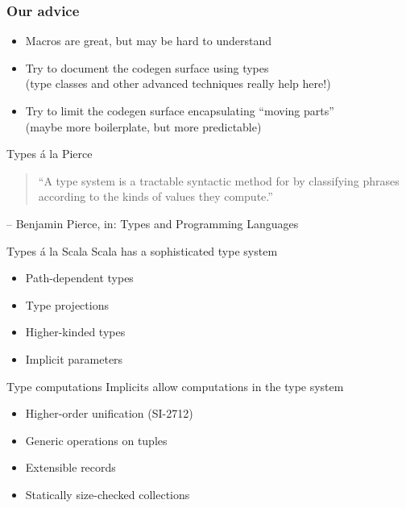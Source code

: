 \documentclass{beamer}
\begin{document}
\begin{frame}[fragile]
\frametitle{Our advice}
  \begin{itemize}
    \item Macros are great, but may be hard to understand
    \item Try to document the codegen surface using types\\
      (type classes and other advanced techniques really help here!)
    \item Try to limit the codegen surface encapsulating ``moving parts''\\
      (maybe more boilerplate, but more predictable)
  \end{itemize}
\end{frame}


\begin{frame}
\vskip40pt
\begin{center}
\end{center}
\end{frame}

\begin{frame}{Types \'a la Pierce}
  \begin{quote}
    ``A type system is a tractable syntactic method for  by classifying phrases according to the kinds of values they compute.''
  \end{quote}
  \hfill -- Benjamin Pierce, in: Types and Programming Languages
\end{frame}

\begin{frame}{Types \'a la Scala}
  Scala has a sophisticated type system
  \begin{itemize}
    \item Path-dependent types
    \item Type projections
    \item Higher-kinded types
    \item Implicit parameters
  \end{itemize}
\end{frame}

\begin{frame}{Type computations}
  Implicits allow computations in the type system

  \begin{itemize}
    \item Higher-order unification (SI-2712)
    \item Generic operations on tuples
    \item Extensible records
    \item Statically size-checked collections
  \end{itemize}
\end{frame}
\end{document}

